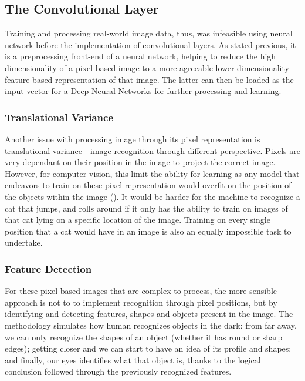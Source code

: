 \documentclass[solid,math,chem,code,plot,gloss]{bmc}
\begin{document}
\subsection{The Convolutional Layer}

Training and processing real-world image data, thus, was infeasible using neural network before the implementation of convolutional layers. As stated previous, it is a preprocessing front-end of a neural network, helping to reduce the high dimensionality of a pixel-based image to a more agreeable lower dimensionality feature-based representation of that image. The latter can then be loaded as the input vector for a Deep Neural Networks for further processing and learning. 

\subsubsection{Translational Variance}

Another issue with processing image through its pixel representation is translational variance - image recognition through different perspective. Pixels are very dependant on their position in the image to project the correct image. However, for computer vision, this limit the ability for learning as any model that endeavors to train on these pixel representation would overfit on the position of the objects within the image (\cite{Ferlitsch}). It would be harder for the machine to recognize a cat that jumps, and rolls around if it only has the ability to train on images of that cat lying on a specific location of the image. Training on every single position that a cat would have in an image is also an equally impossible task to undertake.

\subsubsection{Feature Detection}

For these pixel-based images that are complex to process, the more sensible approach is not to  to implement recognition through pixel positions, but by identifying and detecting features, shapes and objects present in the image. The methodology simulates how human recognizes objects in the dark: from far away, we can only recognize the shapes of an object (whether it has round or sharp edges); getting closer and we can start to have an idea of its profile and shapes; and finally, our eyes identifies what that object is, thanks to the logical conclusion followed through the previously recognized features. 
\end{document}
